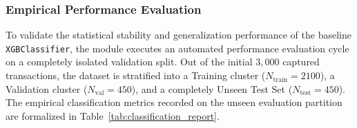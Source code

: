 \documentclass[12pt]{report}
\begin{document}
\subsubsection{Empirical Performance Evaluation}
To validate the statistical stability and generalization performance of the baseline \texttt{XGBClassifier}, the module executes an automated performance evaluation cycle on a completely isolated validation split. Out of the initial $3,000$ captured transactions, the dataset is stratified into a Training cluster ($N_{\text{train}} = 2100$), a Validation cluster ($N_{\text{val}} = 450$), and a completely Unseen Test Set ($N_{\text{test}} = 450$). 
\\
The empirical classification metrics recorded on the unseen evaluation partition are formalized in Table~\ref{tab:classification_report}.
\end{document}
